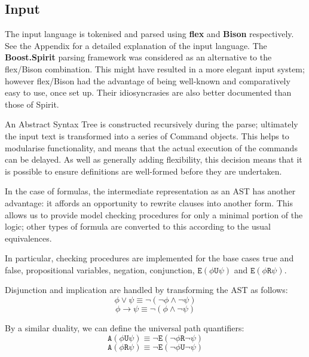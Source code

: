 \documentclass[11pt]{article}
\theoremstyle{definition}
\begin{document}




\subsection{Input}

The input language is tokenised and parsed using \textbf{flex} and
\textbf{Bison} respectively. See the Appendix for a detailed explanation of the
input language. The \textbf{Boost.Spirit} parsing framework was considered as
an alternative to the flex/Bison combination. This might have resulted in a
more elegant input system; however flex/Bison had the advantage of being
well-known and comparatively easy to use, once set up. Their idiosyncrasies are
also better documented than those of Spirit.

An Abstract Syntax Tree is constructed recursively during the parse; ultimately
the input text is transformed into a series of Command objects. This helps to
modularise functionality, and means that the actual execution of the commands
can be delayed. As well as generally adding flexibility, this decision means
that it is possible to ensure definitions are well-formed before they are
undertaken.

In the case of formulas, the intermediate representation as an AST has another
advantage: it affords an opportunity to rewrite clauses into another form.
This allows us to provide model checking procedures for only a minimal portion
of the logic; other types of formula are converted to this according to the
usual equivalences.

In particular, checking procedures are implemented for the base cases true and
false, propositional variables, negation, conjunction,
$\texttt{E}(\phi\texttt{U}\psi)$ and $\texttt{E}(\phi\texttt{R}\psi)$.

Disjunction and implication are handled by transforming the AST as follows:
\[ \phi \vee \psi \equiv \neg ( \neg \phi \wedge \neg \psi ) \]
\[ \phi \rightarrow \psi \equiv \neg ( \phi \wedge \neg \psi ) \]

By a similar duality, we can define the universal path quantifiers:\cite{Kreutzer10}
\[ \texttt{A}(\phi\texttt{U}\psi) \equiv \neg\texttt{E}(\neg\phi\texttt{R}\neg\psi) \]
\[ \texttt{A}(\phi\texttt{R}\psi) \equiv \neg\texttt{E}(\neg\phi\texttt{U}\neg\psi) \]

\end{document}
